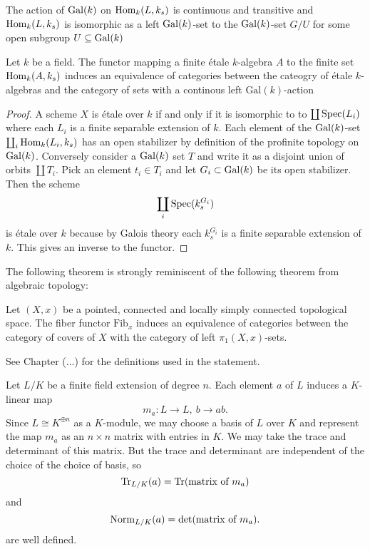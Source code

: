 \begin{proposition}
  The action of $\operatorname{Gal}(k)$ on $\operatorname{Hom}_k(L, k_s)$ is continuous and transitive and $\operatorname{Hom}_k(L, k_s)$ is isomorphic as a left $\operatorname{Gal}(k)$-set to the $\operatorname{Gal}(k)$-set $G/U$ for some open subgroup $U \subseteq \operatorname{Gal}(k)$
\end{proposition}

\begin{theorem}
  Let $k$ be a field. The functor mapping a finite \'etale $k$-algebra $A$ to the finite set $\operatorname{Hom}_k(A, k_s)$ induces an equivalence of categories between the cateogry of \'etale $k$-algebras and the category of sets with a continous left $\text{Gal}(k)$-action
\end{theorem}

\begin{proof}
  A scheme $X$ is \'etale over $k$ if and only if it is isomorphic to to $\coprod \operatorname{Spec}(L_i)$ where each $L_i$ is a finite separable extension of $k$. Each element of the $\operatorname{Gal}(k)$-set $\coprod_i \operatorname{Hom}_k(L_i, k_s)$ has an open stabilizer by definition of the profinite topology on $\operatorname{Gal}(k)$. Conversely consider a $\operatorname{Gal}(k)$ set $T$ and write it as a disjoint union of orbits $\coprod T_i$. Pick an element $t_i \in T_i$ and let $G_i \subset \operatorname{Gal}(k)$ be its open stabilizer. Then the scheme 
  \[
    \coprod_i \operatorname{Spec}(k_s^{G_i})
  \]
  is \'etale over $k$ because by Galois theory each $k_s^{G_i}$ is a finite separable extension of $k$. This gives an inverse to the functor.
\end{proof}

The following theorem is strongly reminiscent of the following theorem from algebraic topology:

\begin{theorem}
  Let $(X,x)$ be a pointed, connected and locally simply connected topological space. The fiber functor $\text{Fib}_x$ induces an equivalence of categories between the category of covers of $X$ with the category of left $\pi_1(X,x)$-sets.
\end{theorem}

See Chapter (...) for the definitions used in the statement.

Let $L/K$ be a finite field extension of degree $n$. Each element $a$ of $L$ induces a $K$-linear map 
\[
  m_a: L \to L,\ b \to ab.
\]
Since $L \cong K^{\oplus n}$ as a $K$-module, we may choose a basis of $L$ over $K$ and represent the map $m_a$ as an $n \times n$ matrix with entries in $K$. We may take the trace and determinant of this matrix. But the trace and determinant are independent of the choice of the choice of basis, so
\[ 
  \operatorname{Tr}_{L/K}(a) = \operatorname{Tr}(\text{matrix of }m_a)
\]
and
\[ 
  \operatorname{Norm}_{L/K}(a) = \text{det}(\text{matrix of }m_a).
\]
are well defined.

